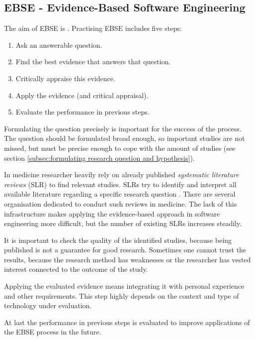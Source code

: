 
\subsection{EBSE - Evidence-Based Software Engineering}
\label{subsec:EBSE}

The aim of EBSE is  \cite{Dyba2005}. Practising EBSE includes five steps:
\begin{enumerate}
	\item Ask an answerable question.
	\item Find the best evidence that answers that question.
	\item Critically appraise this evidence.
	\item Apply the evidence (and critical appraisal).
	\item Evaluate the performance in previous steps.
\end{enumerate}
Formulating the question precisely is important for the success of the process. The question should be formulated broad enough, so important studies are not missed, but must be precise enough to cope with the amount of studies (see section \ref{subsec:formulating research question and hypothesis}).

In medicine researcher heavily rely on already published \emph{systematic literature reviews} (SLR) to find relevant studies. SLRs try to identify and interpret all available literature regarding a specific research question \cite{keele2007}. There are several organisation dedicated to conduct such reviews in medicine. The lack of this infrastructure makes applying the evidence-based approach in software engineering more difficult, but the number of existing SLRs increases steadily.

It is important to check the quality of the identified studies, because being published is not a guarantee for good research. Sometimes one cannot trust the results, because the research method has weaknesses or the researcher has vested interest connected to the outcome of the study.

Applying the evaluated evidence means integrating it with personal experience and other requirements. This step highly depends on the context and type of technology under evaluation.

At last the performance in previous steps is evaluated to improve applications  of the EBSE process in the future.

